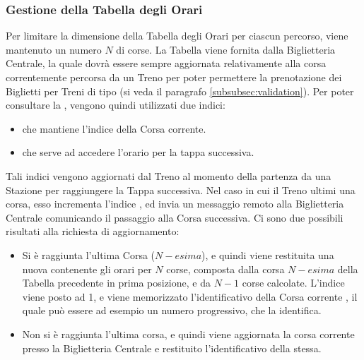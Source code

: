 
		\subsubsection{Gestione della Tabella degli Orari}
		
		Per limitare la dimensione della Tabella degli Orari per ciascun percorso, viene mantenuto un numero $N$ di corse. La Tabella viene fornita dalla Biglietteria Centrale, la quale dovrà essere sempre aggiornata relativamente alla corsa correntemente percorsa da un Treno per poter permettere la prenotazione dei Biglietti per Treni di tipo  (si veda il paragrafo \ref{subsubsec:validation}). Per poter consultare la , vengono quindi utilizzati due indici:
		
		\begin{itemize}
			\item {} che mantiene l'indice della Corsa corrente.
			\item {} che serve ad accedere l'orario per la tappa successiva.
		\end{itemize}
		
	Tali indici vengono aggiornati dal Treno al momento della partenza da una Stazione per raggiungere la Tappa successiva. Nel caso in cui il Treno ultimi una corsa, esso incrementa l'indice , ed invia un messaggio remoto  alla Biglietteria Centrale comunicando il passaggio alla Corsa successiva. Ci sono due possibili risultati alla richiesta di aggiornamento:
	\begin{itemize}
		\item Si è raggiunta l'ultima Corsa ($N-esima$), e quindi viene restituita una nuova  contenente gli orari per $N$ corse, composta dalla corsa $N-esima$ della Tabella precedente in prima posizione, e da $N-1$ corse calcolate. L'indice  viene posto ad 1, e viene memorizzato l'identificativo della Corsa corrente , il quale può essere ad esempio un numero progressivo, che la identifica.
		\item Non si è raggiunta l'ultima corsa, e quindi viene aggiornata la corsa corrente presso la Biglietteria Centrale e restituito l'identificativo della stessa.
	\end{itemize}
	
